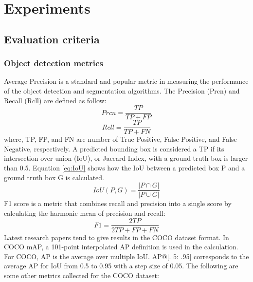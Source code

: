 \chapter{Experiments}\label{chap:exp}

\section{Evaluation criteria} \label{sec:evacri}
\subsection{Object detection metrics}
Average Precision is a standard and popular metric in measuring the performance of the object detection and segmentation algorithms. The Precision (Prcn) and Recall (Rcll) are defined as follow:
\begin{equation}
	Prcn = \frac{TP}{TP+FP}
\end{equation}
\begin{equation}
	Rcll = \frac{TP}{TP+FN}
\end{equation}
where, TP, FP, and FN are number of True Positive, False Positive, and False Negative, respectively. A predicted bounding box is considered a TP if its intersection over union (IoU), or Jaccard Index, with a ground truth box is larger than 0.5. Equation \ref{eq:IoU} shows how the IoU between a predicted box P and a ground truth box G is calculated.
\begin{equation}
	\label{eq:IoU}
	IoU(P,G) = \frac{|P\cap G|}{| P \cup G |}
\end{equation}
F1 score is a metric that combines recall and precision into a single score by calculating the harmonic mean of precision and recall:
\begin{equation}
	F1 = \frac{2TP}{2TP+FP+FN}
\end{equation}
Latest research papers tend to give results in the COCO dataset format. In COCO mAP, a 101-point interpolated AP definition is used in the calculation. For COCO, AP is the average over multiple IoU. AP@[. 5: .95] corresponds to the average AP for IoU from 0.5 to 0.95 with a step size of 0.05. The following are some other metrics collected for the COCO dataset:

